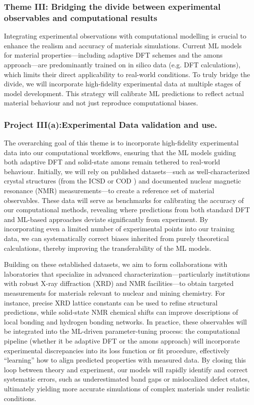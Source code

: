 \documentclass[11pt,english,calcwidth,compact]{nserc-appendix}
\begin{document}
\subsubsection*{Theme III: Bridging the divide between experimental observables and computational results}

Integrating experimental observations with computational modelling is crucial to enhance the realism and accuracy of materials simulations. Current ML models for material properties---including adaptive DFT schemes and the amons approach---are predominantly trained on in silico data (e.g. DFT calculations), which limits their direct applicability to real-world conditions. To truly bridge the divide, we will incorporate high-fidelity experimental data at multiple stages of model development. This strategy will calibrate ML predictions to reflect actual material behaviour and not just reproduce computational biases.

\subsubsection*{Project III(a):Experimental Data validation and use.}  
The overarching goal of this theme is to incorporate high-fidelity experimental data into our computational workflows, ensuring that the ML models guiding both adaptive DFT and solid-state amons remain tethered to real-world behaviour. Initially, we will rely on published datasets—such as well-characterized crystal structures (from the ICSD \cite{levin2018nist} or COD \cite{COD,cod2}) and documented nuclear magnetic resonance (NMR) measurements—to create a reference set of material observables. These data will serve as benchmarks for calibrating the accuracy of our computational methods, revealing where predictions from both standard DFT and ML-based approaches deviate significantly from experiment. By incorporating even a limited number of experimental points into our training data, we can systematically correct biases inherited from purely theoretical calculations, thereby improving the transferability of the ML models.

Building on these established datasets, we aim to form collaborations with laboratories that specialize in advanced characterization—particularly institutions with robust X-ray diffraction (XRD) and NMR facilities—to obtain targeted measurements for materials relevant to nuclear and mining chemistry. For instance, precise XRD lattice constants can be used to refine structural predictions, while solid-state NMR chemical shifts can improve descriptions of local bonding and hydrogen bonding networks. In practice, these observables will be integrated into the ML-driven parameter-tuning process: the computational pipeline (whether it be adaptive DFT or the amons approach) will incorporate experimental discrepancies into its loss function or fit procedure, effectively “learning” how to align predicted properties with measured data. By closing this loop between theory and experiment, our models will rapidly identify and correct systematic errors, such as underestimated band gaps or mislocalized defect states, ultimately yielding more accurate simulations of complex materials under realistic conditions.
\end{document}
